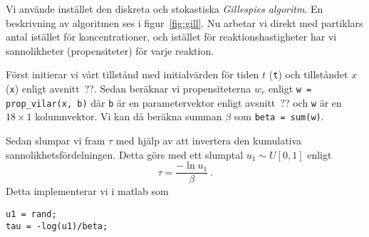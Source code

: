 Vi använde instället den diskreta och stokastiska \emph{Gillespies algoritm}. En beskrivning av algoritmen ses i figur~\ref{fig:gill}. Nu arbetar vi
direkt med partiklars antal istället för koncentrationer, och istället för
reaktionshastigheter har vi sannolikheter (propensiteter) för varje reaktion.

Först initierar vi vårt tillstånd med initialvärden för tiden $t$ (\lstinline|t|) och tillståndet $x$ (\lstinline|x|) enligt avsnitt~??. Sedan beräknar vi propensiteterna $w_r$ enligt \lstinline|w = prop_vilar(x, b)| där \lstinline|b| är en parametervektor enligt avsnitt~?? och \lstinline|w| är en $18 \times 1$ kolumnvektor. Vi kan då beräkna summan $\beta$ som \lstinline|beta = sum(w)|.

Sedan slumpar vi fram $\tau$ med hjälp av att invertera den kumulativa sannolikhetsfördelningen. Detta görs med ett slumptal $u_1 \sim U[0,1]$ enligt
\begin{equation}
\tau = \frac{-\ln u_1}{\beta} \, .
\end{equation}
Detta implementerar vi i matlab som
\begin{lstlisting}
u1 = rand;
tau = -log(u1)/beta;
\end{lstlisting}



